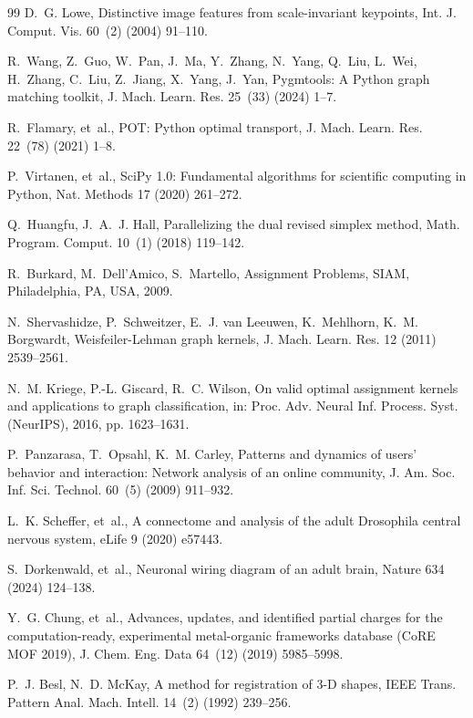 \documentclass[a4paper,fleqn]{cas-dc}
\theoremstyle{thmstyleone}
\theoremstyle{thmstyletwo}
\theoremstyle{thmstylethree}
\begin{document}
\begin{thebibliography}{99}
D.~G. Lowe, Distinctive image features from scale-invariant keypoints, Int. J. Comput. Vis. 60~(2) (2004) 91--110.

R.~Wang, Z.~Guo, W.~Pan, J.~Ma, Y.~Zhang, N.~Yang, Q.~Liu, L.~Wei, H.~Zhang, C.~Liu, Z.~Jiang, X.~Yang, J.~Yan, Pygmtools: A Python graph matching toolkit, J. Mach. Learn. Res. 25~(33) (2024) 1--7.

R.~Flamary, et~al., {POT}: Python optimal transport, J. Mach. Learn. Res. 22~(78) (2021) 1--8.

P.~Virtanen, et~al., {SciPy} 1.0: Fundamental algorithms for scientific computing in Python, Nat. Methods 17 (2020) 261--272.

Q.~Huangfu, J.~A.~J. Hall, Parallelizing the dual revised simplex method, Math. Program. Comput. 10~(1) (2018) 119--142.

R.~Burkard, M.~Dell'Amico, S.~Martello, Assignment Problems, SIAM, Philadelphia, PA, USA, 2009.

N.~Shervashidze, P.~Schweitzer, E.~J. van Leeuwen, K.~Mehlhorn, K.~M. Borgwardt, Weisfeiler-Lehman graph kernels, J. Mach. Learn. Res. 12 (2011) 2539--2561.

N.~M. Kriege, P.-L. Giscard, R.~C. Wilson, On valid optimal assignment kernels and applications to graph classification, in: Proc. Adv. Neural Inf. Process. Syst. (NeurIPS), 2016, pp. 1623--1631.

P.~Panzarasa, T.~Opsahl, K.~M. Carley, Patterns and dynamics of users' behavior and interaction: Network analysis of an online community, J. Am. Soc. Inf. Sci. Technol. 60~(5) (2009) 911--932.

L.~K. Scheffer, et~al., A connectome and analysis of the adult Drosophila central nervous system, eLife 9 (2020) e57443.

S.~Dorkenwald, et~al., Neuronal wiring diagram of an adult brain, Nature 634 (2024) 124--138.

Y.~G. Chung, et~al., Advances, updates, and identified partial charges for the computation-ready, experimental metal-organic frameworks database ({CoRE MOF} 2019), J. Chem. Eng. Data 64~(12) (2019) 5985--5998.

P.~J. Besl, N.~D. McKay, A method for registration of 3-{D} shapes, IEEE Trans. Pattern Anal. Mach. Intell. 14~(2) (1992) 239--256.


\end{thebibliography}
\end{document}
